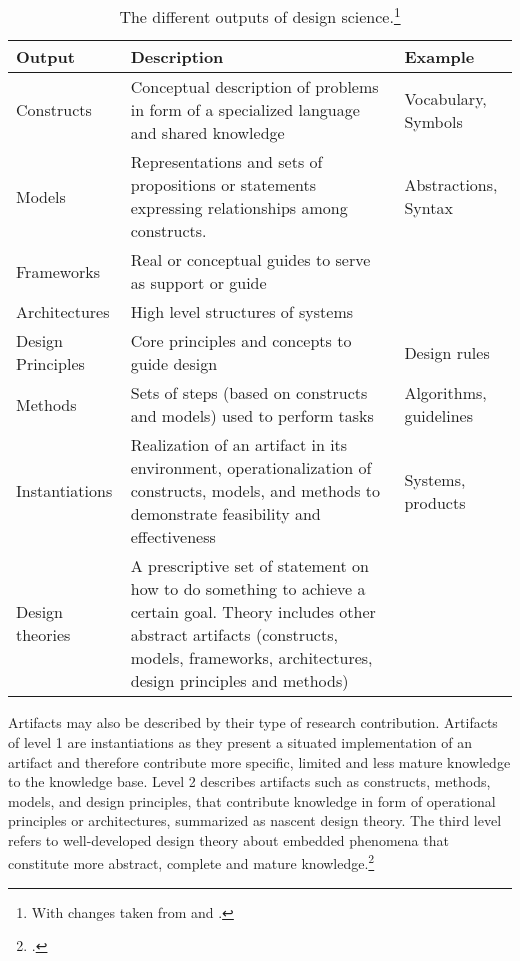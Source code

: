 \begin{table}
\setlength\extrarowheight{2pt} %
  \centering
  \begin{tabularx}{\textwidth}{|l|X|l|}
    \hline
        \textbf{Output} & \textbf{Description} & \textbf{Example}  \\ \hline\hline
        Constructs & Conceptual description of problems in form of a specialized language and shared knowledge & Vocabulary, Symbols \\
        Models & Representations and sets of propositions or statements expressing relationships among constructs. & Abstractions, Syntax \\
        Frameworks & Real or conceptual guides to serve as support or guide & \\
        Architectures & High level structures of systems & \\ 
        Design Principles & Core principles and concepts to guide design & Design rules \\
        Methods & Sets of steps (based on constructs and models) used to perform tasks & Algorithms, guidelines \\
        Instantiations & Realization of an artifact in its environment, operationalization of constructs, models, and methods to demonstrate feasibility and effectiveness & Systems, products \\
        Design theories & A prescriptive set of statement on how to do something to achieve a certain goal. Theory includes other abstract artifacts (constructs, models, frameworks, architectures, design principles and methods) & \\ \hline
    \end{tabularx}
    \caption[The different outputs of design science.]{The different outputs of design science.\footnote{With changes taken from \cite{MarchDesignnaturalscience1995} and \cite{VaishnaviDesignScienceResearch}.} }
    \label{tab:Artifacts}
\end{table}

Artifacts may also be described by their type of research contribution. Artifacts of level 1 are instantiations as they present a situated implementation of an artifact and therefore contribute more specific, limited and less mature knowledge to the knowledge base. Level 2 describes artifacts such as constructs, methods, models, and design principles, that contribute knowledge in form of operational principles or architectures, summarized as nascent design theory. The third level refers to well-developed design theory about embedded phenomena that constitute more abstract, complete and mature knowledge.\footcite[Cf.][p.340]{GregorPositioningpresentingdesign2013} \label{topic:levels} 

